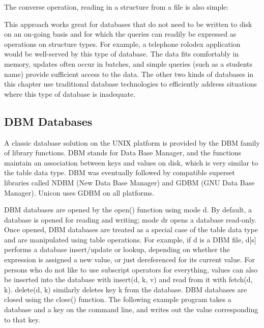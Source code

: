 \noindent
The converse operation, reading in a structure from a file is also
simple:


This approach works great for databases that do not need to be written
to disk on an on-going basis and for which the queries can readily be
expressed as operations on structure types. For example, a telephone
rolodex application would be well-served by this type of database. The
data fits comfortably in memory, updates often occur in batches, and
simple queries (such as a student{\textquotesingle}s name) provide
sufficient access to the data. The other two kinds of databases in this
chapter use traditional database technologies to efficiently address
situations where this type of database is inadequate.

\subsection{DBM Databases}

A classic database solution on the UNIX platform is provided by the DBM
family of library functions. DBM stands for Data Base
Manager, and the functions maintain an association between keys and
values on disk, which is very similar to the table data type. DBM was
eventually followed by compatible superset libraries called NDBM (New
Data Base Manager) and GDBM (GNU Data Base Manager). Unicon uses GDBM
on all platforms.

DBM databases are opened by the \textsf{open()} function using mode
\textsf{{\textquotedbl}d{\textquotedbl}}. By default, a database is
opened for reading and writing; mode
\textsf{{\textquotedbl}dr{\textquotedbl}} opens a database read-only.
Once opened, DBM databases are treated as a special case of the table
data type and are manipulated using table operations. For example, if
\textsf{d} is a DBM file, \textsf{d[s]} performs a database
insert/update or lookup, depending on whether the expression is
assigned a new value, or just dereferenced for its
current value. For persons who do not like to use subscript operators for everything, values can also be
inserted into the database with \textsf{insert(d, k, v)} and read from it with
\textsf{fetch(d, k)}. \textsf{delete(d, k)} similarly deletes key \textsf{k} from
the database. DBM databases are closed using the \textsf{close()}
function. The following example program takes a database and a key on
the command line, and writes out the value corresponding to that key.

